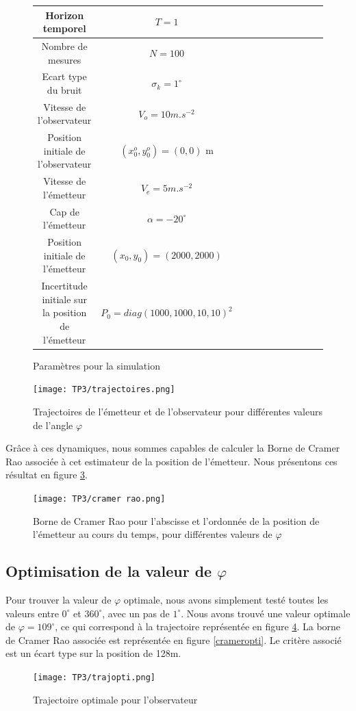 \documentclass{article}
\begin{document}
\begin{figure}[h!]
  \centering
  \caption{Paramètres pour la simulation}
  \label{paramètres}
  \begin{tabular}{|*{11}{c|}}
    \hline Horizon temporel & $T = 1$ \\
    \hline Nombre de mesures  & $N=100$ \\
    \hline Ecart type du bruit & $\sigma_{k}=1^{\circ}$\\
    \hline Vitesse de l'observateur & $V_{o}=10 m.s^{-2}$\\
    \hline Position initiale de l'observateur &  $(x_{0}^{o},y_{0}^{o})=(0,0)$ m\\
    \hline Vitesse de l'émetteur & $V_{e} = 5 m.s^{-2}$\\
    \hline Cap de l'émetteur & $\alpha =-20^{\circ}$\\
    \hline Position initiale de l'émetteur & $(x_{0},y_{0})=(2000,2000)$\\
    \hline Incertitude initiale sur la position de l'émetteur & $P_{0}=diag(1000,1000,10,10)^{2}$\\
    \hline
  \end{tabular}
\end{figure}


 \begin{figure}[h!]
  \centering
  \texttt{[image: TP3/trajectoires.png]}
  \label{trajectoire}
  \caption{Trajectoires de l'émetteur et de l'observateur pour différentes valeurs de l'angle $\varphi$}
\end{figure}

Grâce à ces dynamiques, nous sommes capables de calculer la Borne de Cramer Rao associée à cet estimateur de la position de l'émetteur. 
Nous présentons ces résultat en figure \ref{cramerrao}. 

\begin{figure}[h!]
  \centering
  \texttt{[image: TP3/cramer rao.png]}
  \caption{Borne de Cramer Rao pour l'abscisse et l'ordonnée de la position de l'émetteur au cours du temps, pour différentes valeurs de $\varphi$}
  \label{cramerrao}
\end{figure}

\subsection{Optimisation de la valeur de $\varphi$}
Pour trouver la valeur de $\varphi$ optimale, nous avons simplement testé toutes les valeurs entre $0^{\circ}$ et $360^{\circ}$, avec un pas de 
$1^{\circ}$. Nous avons trouvé une valeur optimale de $\varphi = 109^{\circ}$, ce qui correspond à la trajectoire représentée en figure
\ref{optimale}. La borne de Cramer Rao associée est représentée en figure \ref{crameropti}. Le critère associé est un écart type sur la position de 128m.
\begin{figure}
  \centering
  \texttt{[image: TP3/trajopti.png]}
  \label{optimale}
  \caption{Trajectoire optimale pour l'observateur}
\end{figure}
\end{document}
